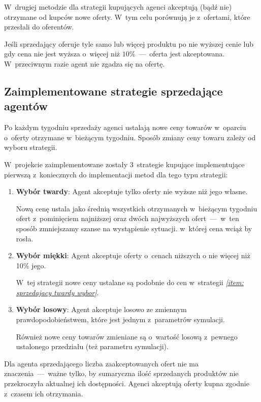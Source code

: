 \documentclass[12pt]{article}
\makeatletter
\def\namedlabel#1#2{\begingroup
   \def\@currentlabel{#2}%
   \label{#1}\endgroup
}
\makeatother
\begin{document}
W~drugiej metodzie dla strategii kupujących agenci akceptują (bądź nie) otrzymane od kupców nowe oferty. W~tym celu porównują je z~ofertami, które przesłali do oferentów. 

Jeśli sprzedający oferuje tyle samo
lub więcej produktu po nie wyższej cenie lub gdy cena nie jest wyższa o~więcej niż $10\%$~---~oferta jest akceptowana. W~przeciwnym razie agent nie zgadza się na ofertę.

\subsection{Zaimplementowane strategie sprzedające agentów}
Po każdym tygodniu sprzedaży agenci ustalają nowe ceny towarów w~oparciu o~oferty otrzymane w~bieżącym tygodniu. Sposób zmiany ceny towaru zależy od wyboru strategii.

W~projekcie zaimplementowane zostały 3~strategie kupujące implementujące pierwszą z~koniecznych do implementacji metod dla tego typu strategii:
\begin{enumerate}
 \item \namedlabel{item: sprzedajacy twardy wybor}{Wybór twardy} \textbf{Wybór twardy}: Agent akceptuje tylko oferty nie wyższe niż jego własne.

Nową cenę ustala jako średnią wszystkich otrzymanych w~bieżącym tygodniu ofert z~pominięciem najniższej oraz dwóch najwyższych ofert~---~w~ten sposób zmniejszamy szanse na wystąpienie sytuacji. w~której cena 
wciąż by rosła.
 \item \namedlabel{item: sprzedajacy miekki wybor}{Wybór miękki} \textbf{Wybór miękki}: Agent akceptuje oferty o~cenach niższych o nie więcej niż 10\% jego.

W~tej strategii nowe ceny ustalane są podobnie do cen w~strategii \emph{\ref{item: sprzedajacy twardy wybor}}.

 \item \namedlabel{item: sprzedajacy losowo}{Wybór losowy} \textbf{Wybór losowy}: Agent akceptuje losowo ze zmiennym prawdopodobieństwem, które jest jednym z~parametrów symulacji.

Również nowe ceny towarów zmieniane są o~wartość losową z~pewnego ustalonego przedziału (też parametru symulacji).
\end{enumerate}

Dla agenta sprzedającego liczba zaakceptowanych ofert nie ma znaczenia~---~ważne tylko, by sumaryczna ilość sprzedanych produktów nie przekroczyła aktualnej ich dostępności. Agenci akceptują oferty kupna
zgodnie z~czasem ich otrzymania.
\end{document}
